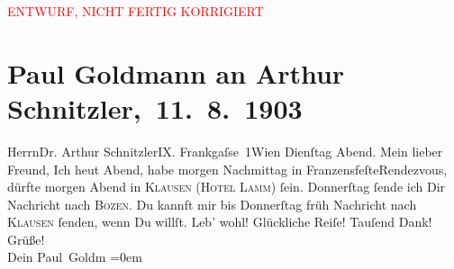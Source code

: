 
\begin{center}
            \textcolor{red}{ENTWURF, NICHT FERTIG KORRIGIERT}
                      \end{center}
            
         \renewcommand{\erwaehnteOrte}{Orte: Bozen, Frankgasse, Franzensfeste, Gasthof zum Lamm, Klausen (Südtirol), Wien}
         \renewcommand{\erwaehnteWerke}{}
               \section[ Paul Goldmann an Arthur Schnitzler, 11. 8. 1903]{ Paul Goldmann an Arthur Schnitzler, 11. 8. 1903}\nopagebreak{}\rehead{ }\begin{ledgroupsized}[t]{13cm}\normalsize\beginnumbering \toendnotes[C]{\smallbreak\pagebreak[2]} 
\toendnotes[C]{\smallbreak}\pstart{}{\pb}Herrn\pend{}\pstart{}Dr. Arthur Schnitzler\pend{}\pstart{}IX. Frankgaſse 1\pend{}\pstart{}Wien\pend{}{\bigskip}\pstart
           {\pb}Dienſtag{ }Abend.\pend
           \pstart{}Mein lieber Freund,\pend\pstart
           Ich \label{K_L03383-1v}\label{K_L03383-1h}{ }heut{ }Abend, habe morgen{ }Nachmittag in FranzensfeſteRendezvous, dürfte morgen{ }Abend in \textsc{Klausen} (\textsc{Hotel Lamm}) ſein. Donnerſtag ſende ich Dir Nachricht nach
                  \textsc{Bozen}. Du kannft mir bis Donnerſtag{ }früh Nachricht nach \textsc{Klausen} ſenden, wenn Du willſt.\pend
           \pstart
           Leb’ wohl! Glückliche Reiſe! Tauſend Dank! Grüße! {\\[\baselineskip]}Dein \spacefill\mbox{Paul
                  Goldm}\pend
           \leftskip=0em{}
         
         \endnumbering{}\end{ledgroupsized}  \newcommand{\dateiname}{L03383}\newcommand{\titel}{Paul Goldmann an Arthur Schnitzler, 11. 8. 1903}\newcommand{\editorInnen}{Martin Anton Müller und Laura Untner}
      